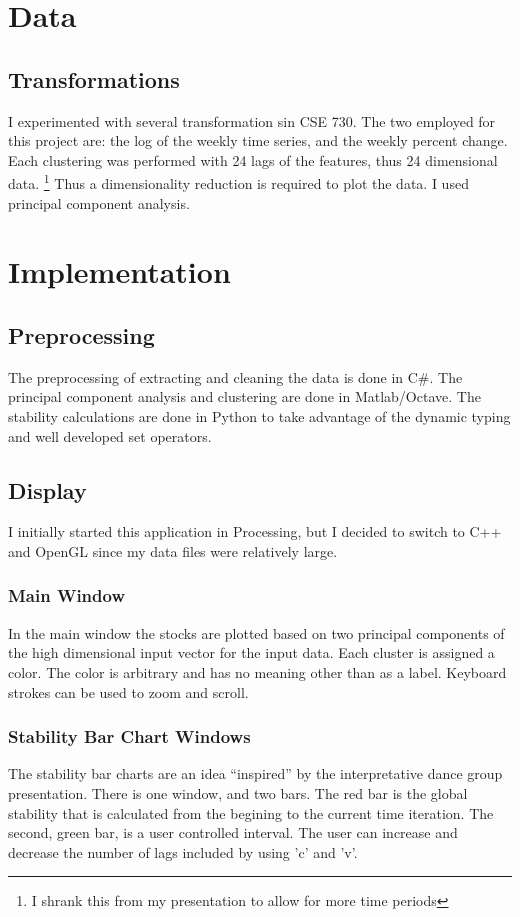 \documentclass{article}
\begin{document}
\begin{multicols}{2}
\section{Data}
\subsection{Transformations}
I experimented with several transformation sin CSE 730.  The two employed for this project are: the log of the weekly time series, and the  weekly percent change.  Each clustering was performed with 24 lags of the features, thus 24 dimensional data. \footnote{I shrank this from my presentation to allow for more time periods}  Thus a dimensionality reduction is required to plot the data.  I used principal component analysis.
\section{Implementation}
\subsection{Preprocessing}
The preprocessing of extracting and cleaning the data is done in C\#.  The principal component analysis and clustering are done in Matlab/Octave.  The stability calculations are done in Python to take advantage of the dynamic typing and well developed set operators.
\subsection{Display}
I initially started this application in Processing, but I decided to switch to C++ and OpenGL since my data files were relatively large.  
\subsubsection{Main Window}
In the main window the stocks are plotted based on two principal components of the high dimensional input vector for the input data.  Each cluster is assigned a color.  The color is arbitrary and has no meaning other than as a label.  Keyboard strokes can be used to zoom and scroll.

\subsubsection{Stability Bar Chart Windows}
The stability bar charts are an idea ``inspired'' by the interpretative dance group presentation.  There is one window, and two bars.  The red bar is the global stability that is calculated from the begining to the current time iteration.  The second, green bar, is a user controlled interval.  The user can increase and decrease the number of lags included by using 'c' and 'v'.


\end{multicols}
\end{document}
